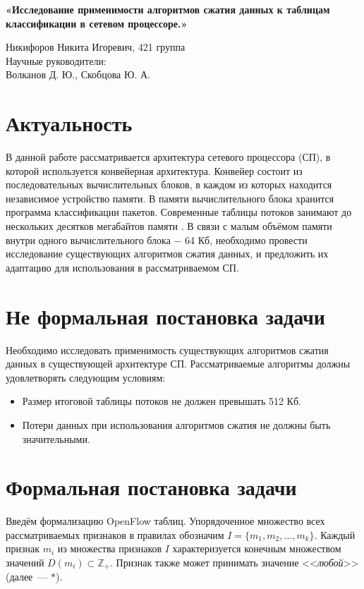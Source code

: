 \documentclass[a4peper, 12pt, titlepage, finall]{extreport}
\begin{document}
\begin{center}
    {\large \bf «Исследование применимости алгоритмов сжатия данных к таблицам классификации в сетевом процессоре.»}

\end{center}
        \begin{flushright}
            {Никифоров Никита Игоревич, 421 группа}\\
            {Научные руководители:\\ Волканов Д. Ю., Скобцова Ю. А.}
        \end{flushright}
    \section{Актуальность}
        В данной работе рассматривается архитектура сетевого процессора (СП), в которой используется конвейерная архитектура.
        Конвейер состоит из последовательных вычислительных блоков, в каждом из которых находится независимое устройство памяти.
        В памяти вычислительного блока хранится программа классификации пакетов. Современные таблицы потоков занимают
        до нескольких десятков мегабайтов памяти \cite{rottenstreich2016optimal}.
        В связи с малым объёмом памяти внутри одного вычислительного блока $-$ 64 Кб, 
        необходимо провести исследование существующих алгоритмов сжатия данных, и предложить их адаптацию для использования 
        в рассматриваемом СП.
    \section{Не формальная постановка задачи}
        Необходимо исследовать применимость существующих алгоритмов сжатия данных в существующей архитектуре СП.
        Рассматриваемые алгоритмы должны удовлетворять следующим условиям:
        \begin{itemize}
            \item Размер итоговой таблицы потоков не должен превышать 512 Кб.
            \item Потери данных при использования алгоритмов сжатия не должны быть значительными.
        \end{itemize}
    \section{Формальная постановка задачи}

        Введём формализацию OpenFlow таблиц.
        Упорядоченное множество всех рассматриваемых признаков в правилах обозначим \(I=\{m_1,m_2,\ldots,m_k\}\). 
        Каждый признак \(m_i\) из множества признаков \(I\) характеризуется конечным множеством значений \(D(m_i)\subset\mathbb{Z_+}\). 
        Признак также может принимать значение <<\textit{любой}>> (далее~--- \(*\)).
\end{document}
